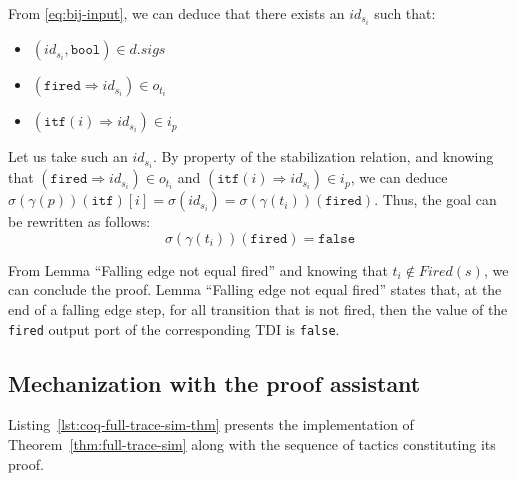 \begin{pf}
\begin{itemize}
\begin{enumerate}
     From \eqref{eq:bij-input}, we can deduce that there exists an
     $id_{s_i}$ such that:
     \begin{itemize}
     \item $(id_{s_i},\mathtt{bool})\in{}d.sigs$
     \item $(\mathtt{fired}\Rightarrow{}id_{s_i})\in{}o_{t_i}$
     \item $(\mathtt{itf}(i)\Rightarrow{}id_{s_i})\in{}i_p$
     \end{itemize}

     Let us take such an $id_{s_i}$. By property of the stabilization
     relation, and knowing that
     $(\mathtt{fired}\Rightarrow{}id_{s_i})\in{}o_{t_i}$ and
     $(\mathtt{itf}(i)\Rightarrow{}id_{s_i})\in{}i_p$, we can deduce
     $\sigma(\gamma(p))(\texttt{itf})[i]=\sigma(id_{s_i})=\sigma(\gamma(t_i))(\texttt{fired})$.
     Thus, the goal can be rewritten as follows:
     \begin{equation*}
       \boxed{\sigma(\gamma(t_i))(\mathtt{fired})=\mathtt{false}}
     \end{equation*}

     From Lemma ``Falling edge not equal fired''
     \cite[p.351]{Iampietro2021} and knowing that
     $t_i\notin{}Fired(s)$, we can conclude the proof. Lemma ``Falling
     edge not equal fired'' states that, at the end of a falling edge
     step, for all transition that is not fired, then the value of the
     \texttt{fired} output port of the corresponding TDI is
     \texttt{false}.
   \end{enumerate}
 \end{itemize}
 
\end{pf}


\subsection{Mechanization with the \coq{} proof assistant}
\label{sec:mech-of-the-proof}


Listing~\ref{lst:coq-full-trace-sim-thm} presents the \coq{}
implementation of Theorem~\ref{thm:full-trace-sim} along with the
sequence of tactics constituting its proof.

